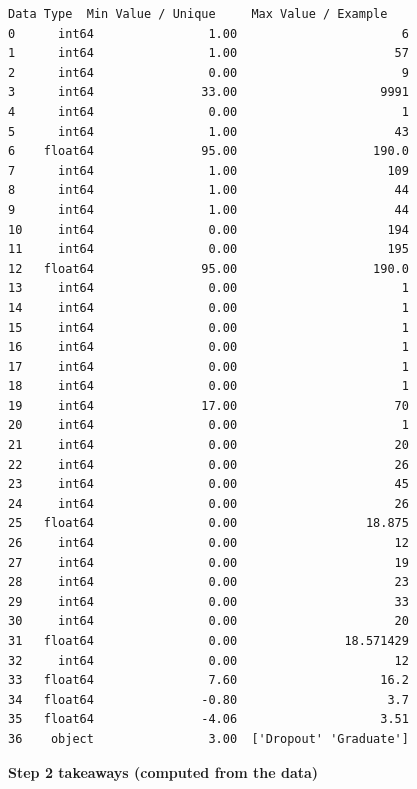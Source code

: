 \documentclass[11pt]{article}
\begin{document}
\begin{Verbatim}[commandchars=\\\{\}]
   Data Type  Min Value / Unique     Max Value / Example  
0      int64                1.00                       6  
1      int64                1.00                      57  
2      int64                0.00                       9  
3      int64               33.00                    9991  
4      int64                0.00                       1  
5      int64                1.00                      43  
6    float64               95.00                   190.0  
7      int64                1.00                     109  
8      int64                1.00                      44  
9      int64                1.00                      44  
10     int64                0.00                     194  
11     int64                0.00                     195  
12   float64               95.00                   190.0  
13     int64                0.00                       1  
14     int64                0.00                       1  
15     int64                0.00                       1  
16     int64                0.00                       1  
17     int64                0.00                       1  
18     int64                0.00                       1  
19     int64               17.00                      70  
20     int64                0.00                       1  
21     int64                0.00                      20  
22     int64                0.00                      26  
23     int64                0.00                      45  
24     int64                0.00                      26  
25   float64                0.00                  18.875  
26     int64                0.00                      12  
27     int64                0.00                      19  
28     int64                0.00                      23  
29     int64                0.00                      33  
30     int64                0.00                      20  
31   float64                0.00               18.571429  
32     int64                0.00                      12  
33   float64                7.60                    16.2  
34   float64               -0.80                     3.7  
35   float64               -4.06                    3.51  
36    object                3.00  ['Dropout' 'Graduate']  
    \end{Verbatim}

    
    \textbf{Step 2 takeaways (computed from the data)}
\end{document}
